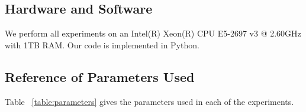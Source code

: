 \documentclass[sigconf]{acmart}
\begin{document}
\subsection{Hardware and Software}
\label{subsec:hardware}

We perform all experiments on an Intel(R) Xeon(R) CPU E5-2697 v3 @ 2.60GHz with 1TB RAM. Our code is implemented in Python.

\subsection{Reference of Parameters Used}
\label{subsec:param-ref}

Table ~\ref{table:parameters} gives the parameters used in each of the experiments.
\end{document}
